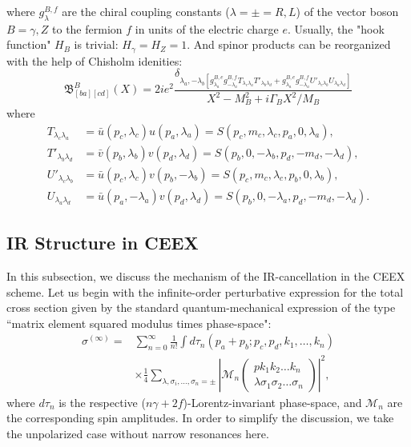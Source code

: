 where $g^{B,f}_\lambda$ are the chiral coupling constants ($\lambda=\pm=R,L$) of the vector boson $B=\gamma,Z$ to the fermion $f$ in units of the electric charge $e$. Usually, the "hook function" $H_B$ is trivial: $H_\gamma=H_Z=1$. And spinor products can be reorganized with the help of Chisholm idenities:
\begin{equation}
\mathfrak{B}^B_{[ba][cd]}(X)=2ie^2\frac{\delta_{\lambda_a,-\lambda_b[g^{B,e}_{\lambda_a}g^{B,f}_{-\lambda_a}T_{\lambda_c\lambda_a}T'_{\lambda_b\lambda_d}+g^{B,e}_{\lambda_a}g^{B,f}_{-\lambda_a}U'_{\lambda_c\lambda_b}U_{\lambda_a\lambda_d}  ]}}{X^2-M^2_B+i\Gamma_BX^2/M_B}
\end{equation}
where
\begin{align}
T_{\lambda_c\lambda_a}&=\bar{u}(p_c,\lambda_c)u(p_a,\lambda_a)=S(p_c,m_c,\lambda_c,p_a,0,\lambda_a),\nonumber\\
T'_{\lambda_b\lambda_d}&=\bar{v}(p_b,\lambda_b)v(p_d,\lambda_d)=S(p_b,0,-\lambda_b,p_d,-m_d,-\lambda_d),\nonumber\\
U'_{\lambda_c\lambda_b}&=\bar{u}(p_c,\lambda_c)v(p_b,-\lambda_b)=S(p_c,m_c,\lambda_c,p_b,0,\lambda_b),\nonumber\\
U_{\lambda_a\lambda_d}&=\bar{u}(p_a,-\lambda_a)v(p_d,\lambda_d)=S(p_b,0,-\lambda_a,p_d,-m_d,-\lambda_d).
\end{align}


\subsection{IR Structure in CEEX}

In this subsection, we discuss the mechanism of the IR-cancellation in the CEEX scheme. Let us begin with the infinite-order perturbative expression for the total cross section given by the standard quantum-mechanical expression of the type ``matrix element squared modulus times phase-space":
\begin{align}
\sigma^{(\infty)}=&\sum_{n=0}^{\infty}\frac{1}{n!}\int d\tau_n(p_a+p_b;p_c,p_d,k_1,\ldots,k_n)\nonumber\\
&\times\frac{1}{4}\sum_{\lambda,\sigma_i,\ldots,\sigma_n=\pm}\left|\mathcal{M}_n\left(\begin{array}{c}
pk_1k_2\ldots k_n\\\lambda\sigma_1\sigma_2\ldots\sigma_n
\end{array}\right)\right|^2,
\end{align}
where $d\tau_n$ is the respective ($n\gamma+2f$)-Lorentz-invariant phase-space, and $\mathcal{M}_n$ are the corresponding spin amplitudes. In order to simplify the discussion, we take the unpolarized case without narrow resonances here.


